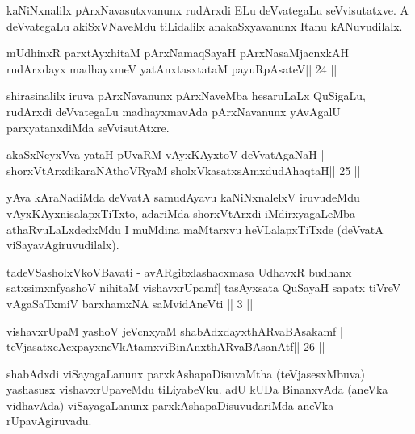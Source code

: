 \begin{artha}
kaNiNxnalilx pArxNavasutxvanunx rudArxdi ELu deVvategaLu seVvisutatxve. A deVvategaLu akiSxVNaveMdu tiLidalilx anakaSxyavanunx Itanu kANuvudilalx.
\end{artha}

\begin{shl}
mUdhinxR parxtAyxhitaM pArxNamaqSayaH pArxNasaMjacnxkAH |
rudArxdayx madhayxmeV yatAnxtasxtataM payuRpAsateV\hfill || 24 ||
\end{shl}

\begin{artha}
shirasinalilx iruva pArxNavanunx pArxNaveMba hesaruLaLx QuSigaLu, rudArxdi deVvategaLu madhayxmavAda pArxNavanunx yAvAgalU parxyatanxdiMda seVvisutAtxre.
\end{artha}

\begin{shl}
akaSxNeyxVva yataH pUvaRM vAyxKAyxtoV deVvatAgaNaH |
shorxVtArxdikaraNAthoVR\s yaM sholxVkasatxsAmxdudAhaqtaH\hfill || 25 ||
\end{shl}

\begin{artha}
yAva kAraNadiMda deVvatA samudAyavu kaNiNxnalelxV iruvudeMdu vAyxKAyxnisalapxTiTxto, adariMda shorxVtArxdi iMdirxyagaLeMba athaRvuLaLxdedxMdu I muMdina maMtarxvu heVLalapxTiTxde (deVvatA viSayavAgiruvudilalx).
\end{artha}




\begin{kandikeshl}
tadeVSasholxVkoVBavati - avARgibxlashacxmasa UdhavxR budhanx
satxsimxnfyashoV  nihitaM vishavxrUpamf| tasAyx\s\s sata QuSayaH
sapatx tiVreV vAgaSaTxmiV barxhamxNA saMvidAneVti || 3 ||
\end{kandikeshl}

\begin{shl}
vishavxrUpaM yashoV jeVcnxyaM shabAdxdayxthARvaBAsakamf |
teVjasatxcAcxpayxneVkAtamxviBinAnxthARvaBAsanAtf\hfill || 26 ||
\end{shl}

\begin{artha}
shabAdxdi viSayagaLanunx parxkAshapaDisuvaMtha (teVjasesxMbuva) yashasusx vishavxrUpaveMdu tiLiyabeVku. adU kUDa BinanxvAda (aneVka vidhavAda) viSayagaLanunx parxkAshapaDisuvudariMda aneVka rUpavAgiruvadu.
\end{artha}

